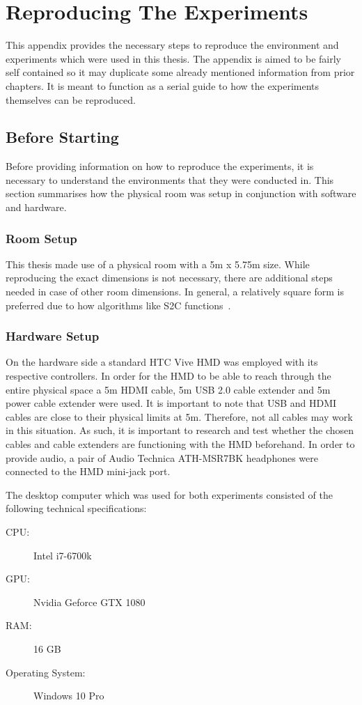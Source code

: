 \chapter{Reproducing The Experiments} \label{app:reproduction}
This appendix provides the necessary steps to reproduce the environment and experiments which were used in this thesis. The appendix is aimed to be fairly self contained so it may duplicate some already mentioned information from prior chapters. It is meant to function as a serial guide to how the experiments themselves can be reproduced. 

\section{Before Starting}
Before providing information on how to reproduce the experiments, it is necessary to understand the environments that they were conducted in. This section summarises how the physical room was setup in conjunction with software and hardware.

\subsection{Room Setup}
This thesis made use of a physical room with a 5m x 5.75m size. While reproducing the exact dimensions is not necessary, there are additional steps needed in case of other room dimensions. In general, a relatively square form is preferred due to how algorithms like S2C functions~\cite{azmandian2015physical}. 

\subsection{Hardware Setup}
On the hardware side a standard HTC Vive HMD was employed with its respective controllers. In order for the HMD to be able to reach through the entire physical space a 5m HDMI cable, 5m USB 2.0 cable extender and 5m power cable extender were used. It is important to note that USB and HDMI cables are close to their physical limits at 5m. Therefore, not all cables may work in this situation. As such, it is important to research and test whether the chosen cables and cable extenders are functioning with the HMD beforehand. In order to provide audio, a pair of Audio Technica ATH-MSR7BK headphones were connected to the HMD mini-jack port. 

The desktop computer which was used for both experiments consisted of the following technical specifications:
\begin{description}
   \item[CPU:] Intel i7-6700k
   \item[GPU:] Nvidia Geforce GTX 1080
   \item[RAM:] 16 GB
   \item[Operating System:] Windows 10 Pro
\end{description}

